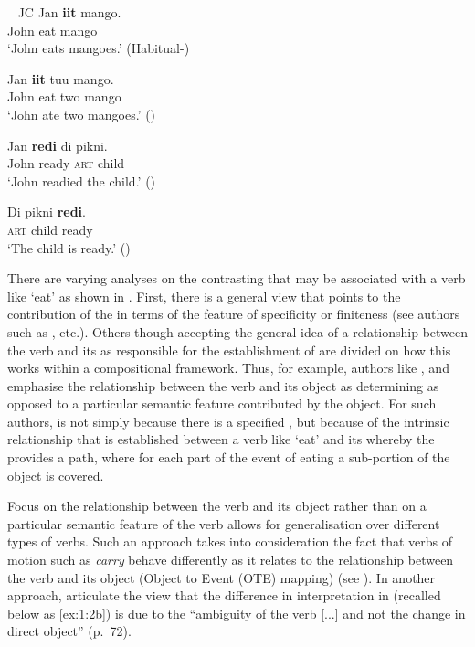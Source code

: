 \ea\label{ex:1:7}~ JC
  \ea 
    \gll Jan \textbf{iit} mango.\\
    		John eat mango\\
    \glt `John eats mangoes.' (Habitual-)

    \ex
    \gll Jan \textbf{iit} tuu mango.\\
    		John eat two mango\\
    \glt `John ate two mangoes.' ()
    \z
  \z			

  \ea\label{ex:1:8}
    \ea
    \gll Jan \textbf{redi} di pikni.\\
   		 John ready \textsc{art} child\\
    \glt `John readied the child.' ()

    \ex
    \gll Di pikni \textbf{redi}.\\
    \textsc{art} child ready\\
    \glt `The child is ready.' ()
    \z
  \z 

There are varying analyses on the contrasting  that may be associated
with a verb like `eat' as shown in .  First, there is a general view
that points to the contribution of the  in terms of the feature
of specificity or finiteness (see authors such as
\citealt{Garey1957,MacDonald2008,Tenny1994,Verkuyl1993,Verkuyl1999}, etc.).  Others
though accepting the general idea of a relationship between the verb and its
 as responsible for the establishment of  are divided
on how this works within a compositional framework.  Thus, for example,
authors like \citet{Jackendoff1996}, and \citet{Krifka1998} emphasise the
relationship between the verb and its object as determining  as opposed
to a particular semantic feature contributed by the object.  For such authors,
 is not  simply because there is a specified ,
but because of the intrinsic relationship that is established between a verb
like `eat' and its  whereby the  provides a path, where for each part of the event of eating a sub-portion of the object is
covered.



Focus on the relationship between the verb and its object rather than on a
particular semantic feature of the verb allows for generalisation over different
types of verbs.  Such an approach takes into consideration the fact that verbs
of motion such as \textit{carry} behave differently as it relates to the relationship
between the verb and its object (Object to Event (OTE) mapping) (see
\citealt{Krifka1998,MacDonald2008,Tenny1994}).  In another approach, 
\citet{BennettPartee2004} articulate the view that the difference in interpretation in
 (recalled below as \ref{ex:1:2b}) is due to the ``ambiguity of the verb [...] and not the change in
direct object'' (p.~72).  

